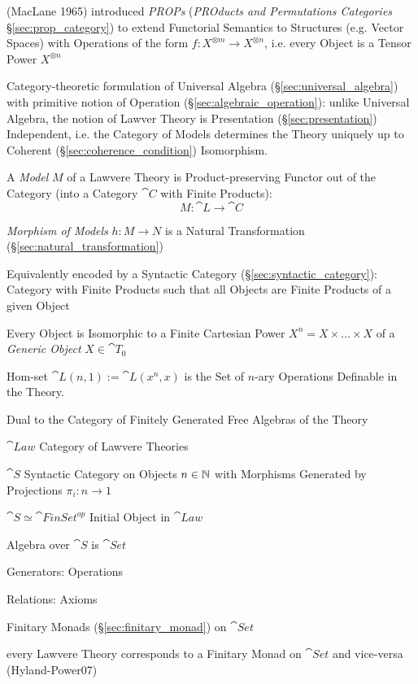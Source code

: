 \fist (MacLane 1965) introduced \emph{PROPs} (\emph{PROducts and Permutations
  Categories} \S\ref{sec:prop_category}) to extend Functorial Semantics to
Structures (e.g. Vector Spaces) with Operations of the form $f : X^{\otimes m}
\rightarrow X^{\otimes n}$, i.e. every Object is a Tensor Power $X^{\otimes n}$

Category-theoretic formulation of Universal Algebra
(\S\ref{sec:universal_algebra}) with primitive notion of Operation
(\S\ref{sec:algebraic_operation}): unlike Universal Algebra, the notion of
Lawver Theory is Presentation (\S\ref{sec:presentation}) Independent, i.e. the
Category of Models determines the Theory uniquely up to Coherent
(\S\ref{sec:coherence_condition}) Isomorphism. \cite{hyland-power06}

A \emph{Model} $M$ of a Lawvere Theory is Product-preserving Functor out of the
Category (into a Category $\cat{C}$ with Finite Products):
\[
  M : \cat{L} \rightarrow \cat{C}
\]

\emph{Morphism of Models} $h : M \rightarrow N$ is a Natural Transformation
(\S\ref{sec:natural_transformation})

Equivalently encoded by a Syntactic Category (\S\ref{sec:syntactic_category}):
Category with Finite Products such that all Objects are Finite Products of a
given Object

Every Object is Isomorphic to a Finite Cartesian Power $X^n = X \times \ldots
\times X$ of a \emph{Generic Object} $X \in \cat{T}_0$

Hom-set $\cat{L}(n,1) := \cat{L}(x^n,x)$ is the Set of $n$-ary Operations
Definable in the Theory.

Dual to the Category of Finitely Generated Free Algebras of the Theory

$\cat{Law}$ Category of Lawvere Theories

$\cat{S}$ Syntactic Category on Objects $n \in \mathbb{N}$ with Morphisms Generated
by Projections $\pi_i : n \rightarrow 1$

$\cat{S} \simeq \cat{FinSet}^{op}$ Initial Object in $\cat{Law}$

Algebra over $\cat{S}$ is $\cat{Set}$

Generators: Operations

Relations: Axioms

Finitary Monads (\S\ref{sec:finitary_monad}) on $\cat{Set}$

every Lawvere Theory corresponds to a Finitary Monad on $\cat{Set}$ and
vice-versa (Hyland-Power07)

